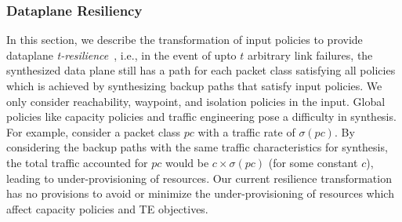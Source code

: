 

\subsubsection{Dataplane Resiliency}
\label{sec:resiliency}


In this section, we describe the transformation of input policies to
provide dataplane \emph{t-resilience}~\cite{plinko}, i.e., in the event of
upto $t$ arbitrary link failures, the synthesized data plane still has
a path for each packet class satisfying all policies which is achieved
by synthesizing backup paths that satisfy input policies.  We only
consider reachability, waypoint, and isolation policies in the input.
Global policies like capacity policies and traffic engineering pose a
difficulty in synthesis. For example, consider a packet class $pc$
with a traffic rate of $\sigma(pc)$. By considering the backup paths
with the same traffic characteristics for synthesis, the total traffic
accounted for $pc$ would be $c\times \sigma(pc)$ (for some constant
$c$), leading to under-provisioning of resources. Our current
resilience transformation has no provisions to avoid or minimize the
under-provisioning of resources which affect capacity policies and TE
objectives.

